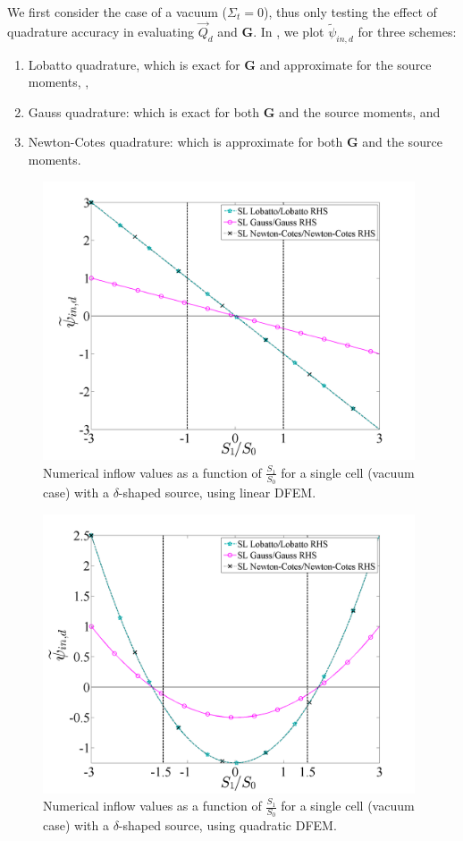 We first consider the case of a vacuum ($\Sigma_t=0$), thus only testing the effect of quadrature accuracy in evaluating $\vec{Q}_d$ and $\mathbf{G}$.  
In , we plot $\widetilde{\psi}_{in,d}$ for three schemes:
\begin{enumerate}
\item Lobatto quadrature, which is exact for $\mathbf{G}$ and approximate for the source moments,  ,
\item Gauss quadrature: which is exact for both $\mathbf{G}$ and the source moments, and 
\item Newton-Cotes quadrature: which is approximate for both $\mathbf{G}$ and the source moments.
\end{enumerate}
\begin{figure}[!hbp]
\centering
\includegraphics[width=11cm]{chapter2_constant_xs/Final_Inflow_RHS_Comparison_Source_P1_MFP_0.png}
\caption{Numerical inflow values as a function of $\frac{S_1}{S_0}$ for a single cell (vacuum case) with a $\delta$-shaped source, using linear DFEM.}
\label{fig:vac_inflow_p1}
\end{figure}
\begin{figure}[!htp]
\centering
\includegraphics[width=11cm]{chapter2_constant_xs/Final_Inflow_RHS_Comparison_Source_P2_MFP_0.png}
\caption{Numerical inflow values as a function of $\frac{S_1}{S_0}$ for a single cell (vacuum case) with a $\delta$-shaped source, using quadratic DFEM.}
\label{fig:vac_inflow_p2}
\end{figure}
